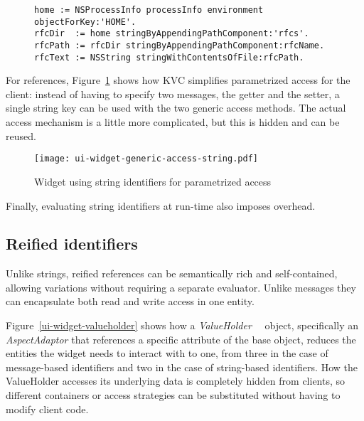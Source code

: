 \documentclass[preprint,authoryear]{llncs}
\begin{document}
\begin{figure}[htbp]
\begin{lstlisting}[style=numbers,label=rfcs-directory,caption=Accessing a specific RFC in a directory relative to the user's \$HOME.]
home := NSProcessInfo processInfo environment objectForKey:'HOME'.
rfcDir  := home stringByAppendingPathComponent:'rfcs'.
rfcPath := rfcDir stringByAppendingPathComponent:rfcName.
rfcText := NSString stringWithContentsOfFile:rfcPath.
\end{lstlisting}
\end{figure}


For references, Figure~\ref{ui-widget-string-access} shows how KVC simplifies parametrized access for 
the client:  instead of having to specify two messages, the getter and the setter, a single string key can be used with
the two generic access methods.  The actual access mechanism is a little more complicated, but this is hidden and can 
be reused.

\begin{figure}[htbp]
\begin{center}
\texttt{[image: ui-widget-generic-access-string.pdf]}
\caption{Widget using string identifiers for parametrized access}
\label{ui-widget-string-access}
\end{center}
\end{figure}

Finally, evaluating string identifiers at run-time also imposes overhead.

\subsection{Reified identifiers}


Unlike strings, reified references can be semantically rich and self-contained, 
allowing variations without requiring a separate evaluator.
Unlike messages they can encapsulate both read and write access in one entity.  



Figure~\ref{ui-widget-valueholder} shows how a \emph{ValueHolder}~\cite{ValueHolder}~\cite{SmalltalkFAQ} object,
specifically an {\em AspectAdaptor} that
references a specific attribute of the base object, reduces the entities the widget
needs to interact with to one, from three in the case of message-based identifiers and two
in the case of string-based identifiers.  How the ValueHolder accesses 
its underlying data is completely hidden from clients, so different containers or access
strategies can be substituted without having to modify client code.
\end{document}
